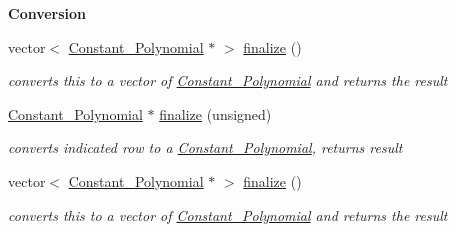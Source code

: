 \begin{Indent}\textbf{ Conversion}\par
\begin{DoxyCompactItemize}
\item 
\mbox{\label{group___g_b_computation_a6f70b5f5779e7aa262d454b9f2bbd2d1}} 
vector$<$ \hyperlink{group__polygroup_class_constant___polynomial}{Constant\+\_\+\+Polynomial} $\ast$ $>$ \hyperlink{group___g_b_computation_a6f70b5f5779e7aa262d454b9f2bbd2d1}{finalize} ()
\begin{DoxyCompactList}\small\item\em converts {\ttfamily this} to a vector of \hyperlink{group__polygroup_class_constant___polynomial}{Constant\+\_\+\+Polynomial} and returns the result \end{DoxyCompactList}\item 
\mbox{\label{group___g_b_computation_a8281d8f4316037e2bd53caf9e1930cb0}} 
\hyperlink{group__polygroup_class_constant___polynomial}{Constant\+\_\+\+Polynomial} $\ast$ \hyperlink{group___g_b_computation_a8281d8f4316037e2bd53caf9e1930cb0}{finalize} (unsigned)
\begin{DoxyCompactList}\small\item\em converts indicated row to a \hyperlink{group__polygroup_class_constant___polynomial}{Constant\+\_\+\+Polynomial}, returns result \end{DoxyCompactList}\item 
\mbox{\label{group___g_b_computation_acb8721524d3d30e98fe153ed08c21232}} 
vector$<$ \hyperlink{group__polygroup_class_constant___polynomial}{Constant\+\_\+\+Polynomial} $\ast$ $>$ \hyperlink{group___g_b_computation_acb8721524d3d30e98fe153ed08c21232}{finalize} ()
\begin{DoxyCompactList}\small\item\em converts {\ttfamily this} to a vector of \hyperlink{group__polygroup_class_constant___polynomial}{Constant\+\_\+\+Polynomial} and returns the result \end{DoxyCompactList}\end{DoxyCompactItemize}
\end{Indent}
